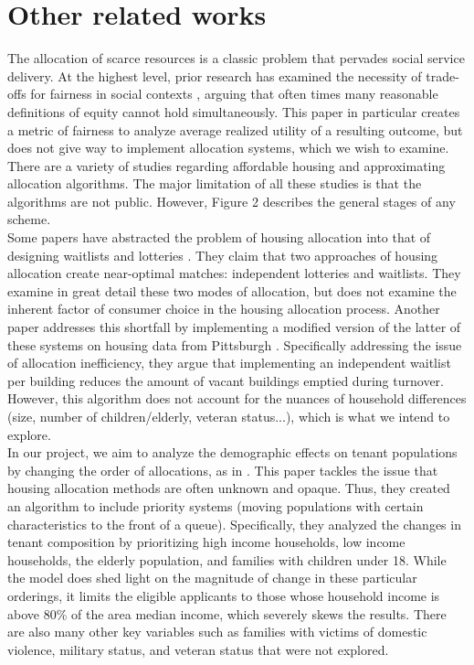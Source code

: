 \documentclass[11pt]{article}
\begin{document}
\section{Other related works}
The allocation of scarce resources is a classic problem that pervades social service delivery. At the highest level, prior research has examined the necessity of trade-offs for fairness in social contexts \cite{mashiat2022trade}, arguing that often times many reasonable definitions of equity cannot hold simultaneously. This paper in particular creates a metric of fairness to analyze average realized utility of a resulting outcome, but does not give way to implement allocation systems, which we wish to examine. \\
\newline
There are a variety of studies regarding affordable housing and approximating allocation algorithms. The major limitation of all these studies is that the algorithms are not public. However, Figure 2 describes the general stages of any scheme.\\
\newline
Some papers have abstracted the problem of housing allocation into that of designing waitlists and lotteries \cite{arnosti2020design}. They claim that two approaches of housing allocation create near-optimal matches: independent lotteries and waitlists. They examine in great detail these two modes of allocation, but does not examine the inherent factor of consumer choice in the housing allocation process. Another paper addresses this shortfall by implementing a modified version of the latter of these systems on housing data from Pittsburgh \cite{harvardpublichousing}. Specifically addressing the issue of allocation inefficiency, they argue that implementing an independent waitlist per building reduces the amount of vacant buildings emptied during turnover. However, this algorithm does not account for the nuances of household differences (size, number of children/elderly, veteran status...), which is what we intend to explore. \\
\newline
In our project, we aim to analyze the demographic effects on tenant populations by changing the order of allocations, as in \cite{nyuaffordablehousing}. This paper tackles the issue that housing allocation methods are often unknown and opaque. Thus, they created an algorithm to include priority systems (moving populations with certain characteristics to the front of a queue). Specifically, they analyzed the changes in tenant composition by prioritizing high income households, low income households, the elderly population, and families with children under 18. While the model does shed light on the magnitude of change in these particular orderings, it limits the eligible applicants to those whose household income is above 80\% of the area median income, which severely skews the results. There are also many other key variables such as families with victims of domestic violence, military status, and veteran status that were not explored.\\
\end{document}
